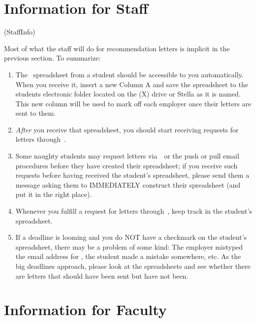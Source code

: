 \documentclass{\econtex}
\begin{document}
\section{Information for Staff}\ifdvi\hypertarget{StaffInfo}{(StaffInfo)}\fi

Most of what the staff will do for recommendation letters is implicit in the previous section.  To
summarize:
\begin{enumerate}
\item The \EMtt~spreadsheet from a student should be accessible to you automatically.  When you receive it, insert a new Column A and save the spreadsheet to the students electronic folder located on the (X) drive or Stella as it is named. This new column will be used to mark off each employer once their letters are sent to them.
\item \textit{After} you receive that spreadsheet, you should start receiving requests for letters through~\jmstaffemail.  
\item Some naughty students may request letters via~\EJM~or the push or pull email procedures before they have created their spreadsheet; if you receive such requests before having received the student's spreadsheet, please send them a message asking them to IMMEDIATELY construct their \EMtt spreadsheet (and put it in the right place).
\item Whenever you fulfill a request for letters through~\jmstaffemail, keep track in the student's spreadsheet.
\item If a deadline is looming and you do NOT have a checkmark on the student's spreadsheet, there may be a problem of some kind: The employer mistyped the email address for \jmstaffemail, the student made a mistake somewhere, etc.  As the big deadlines approach, please look at the spreadsheets and see whether there are letters that should have been sent but have not been.
\end{enumerate}
\hypertarget{information-for-faculty}{}

\section{Information for Faculty}%
\end{document}

